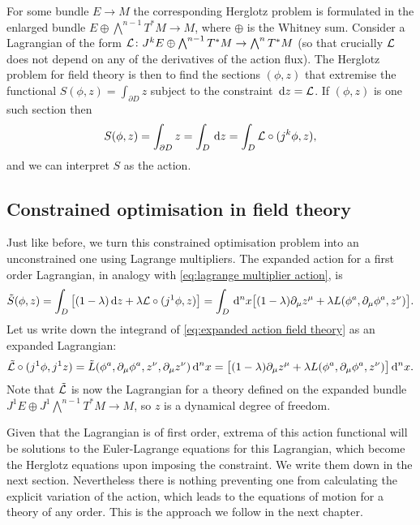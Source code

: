 \documentclass[../main.tex]{subfiles}
\begin{document}
For some bundle \(E \to M\) the corresponding Herglotz problem is formulated in the enlarged bundle \(E \oplus \bigwedge^{n-1}T^\ast M \to M \), where \(\oplus\) is the Whitney sum. Consider a Lagrangian of the form \(\mathcal{L} \colon J^kE \oplus \bigwedge^{n-1}T^\ast M \to \bigwedge^n T^\ast M \) (so that crucially \(\mathcal{L}\) does not depend on any of the derivatives of the action flux). The Herglotz problem for field theory is then to find the sections \((\phi,z)\) that extremise the functional \(S(\phi,z) = \int_{\partial  D} z\) subject to the constraint \(\,\mathrm{d} z = \mathcal{L}\). If \((\phi, z)\) is one such section then
\begin{equation*}
	S(\phi,z) = \int_{\partial D} z = \int_D \,\mathrm{d} z = \int_D  \mathcal{L} \circ (j^k \phi, z),
\end{equation*}
and we can interpret \(S\) as the action. 

\subsection{Constrained optimisation in field theory}
Just like before, we turn this constrained optimisation problem into an
unconstrained one using Lagrange multipliers. The expanded action for a first order Lagrangian, in analogy with
\cref{eq:lagrange multiplier action}, is
\begin{equation}\label{eq:expanded action field theory}
	\tilde{S}(\phi, z) = \int_D \big[(1 - \lambda) \,\mathrm{d} z + \lambda \mathcal{L} \circ (j^1\phi,z)\big]
	= \int_D \,\mathrm{d}^n x \big[ (1 - \lambda) \partial_\mu z^\mu + \lambda L(\phi^a,
	\partial_\mu \phi^a, z^\nu) \big].
\end{equation}
Let us write down the integrand of
\cref{eq:expanded action field theory} as an expanded Lagrangian:
\begin{equation} \label{eq:expanded lagrangian field theory}
	\tilde{\mathcal{L}}\circ(j^1\phi, j^1 z) = \tilde{L}(\phi^a, \partial_\mu \phi^a, z^\nu, \partial_\mu z^\nu)\,\mathrm{d}^n x = \big[ (1 - \lambda)
	\partial_\mu z^\mu + \lambda L(\phi^a, \partial_\mu \phi^a, z^\nu) \big] \,\mathrm{d}^n x.
\end{equation}
Note that \( \Tilde{\mathcal{L}} \) is now the Lagrangian for a theory defined on the expanded bundle \(J^1E \oplus J^1\bigwedge^{n-1}T^\ast M \to M\), so \( z\) is a dynamical degree of freedom. 

Given that the Lagrangian is of first order, extrema of this action functional will be solutions to the Euler-Lagrange equations for this Lagrangian, which become the Herglotz equations upon imposing the constraint. We write them down in the next section. Nevertheless there is nothing preventing one from calculating the explicit variation of the action, which leads to the equations of motion for a theory of any order. This is the approach we follow in the next chapter.
\end{document}

